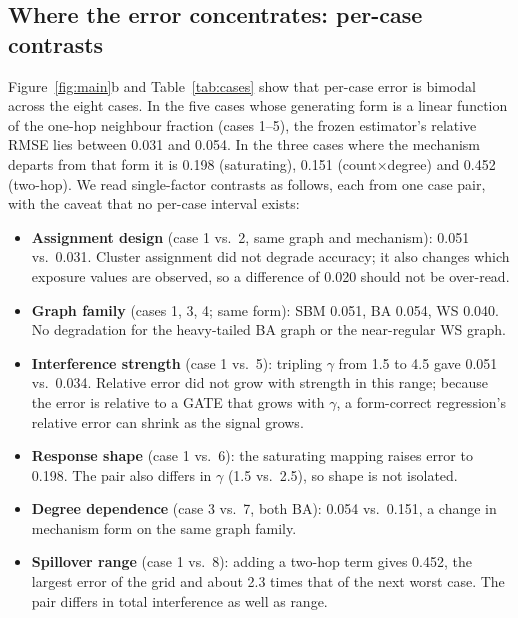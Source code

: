 \documentclass{article}
\begin{document}
\subsection{Where the error concentrates: per-case contrasts}
Figure~\ref{fig:main}b and Table~\ref{tab:cases} show that per-case error is bimodal across the eight cases. In the five cases whose generating form is a linear function of the one-hop neighbour fraction (cases 1--5), the frozen estimator's relative RMSE lies between 0.031 and 0.054. %
 In the three cases where the mechanism departs from that form it is 0.198 (saturating), 0.151 (count$\times$degree) and 0.452 (two-hop). We read single-factor contrasts as follows, each from one case pair, with the caveat that no per-case interval exists:
\begin{itemize}\setlength{\itemsep}{1pt}
\item \textbf{Assignment design} (case 1 vs.\ 2, same graph and mechanism): 0.051 vs.\ 0.031. Cluster assignment did not degrade accuracy; it also changes which exposure values are observed, so a difference of 0.020 should not be over-read.
\item \textbf{Graph family} (cases 1, 3, 4; same form): SBM 0.051, BA 0.054, WS 0.040. No degradation for the heavy-tailed BA graph or the near-regular WS graph.
\item \textbf{Interference strength} (case 1 vs.\ 5): tripling $\gamma$ from 1.5 to 4.5 gave 0.051 vs.\ 0.034. Relative error did not grow with strength in this range; because the error is relative to a GATE that grows with $\gamma$, a form-correct regression's relative error can shrink as the signal grows.
\item \textbf{Response shape} (case 1 vs.\ 6): the saturating mapping raises error to 0.198. The pair also differs in $\gamma$ (1.5 vs.\ 2.5), so shape is not isolated.
\item \textbf{Degree dependence} (case 3 vs.\ 7, both BA): 0.054 vs.\ 0.151, a change in mechanism form on the same graph family.
\item \textbf{Spillover range} (case 1 vs.\ 8): adding a two-hop term gives 0.452, the largest error of the grid and about 2.3 times that of the next worst case. The pair differs in total interference as well as range.
\end{itemize}
\end{document}
